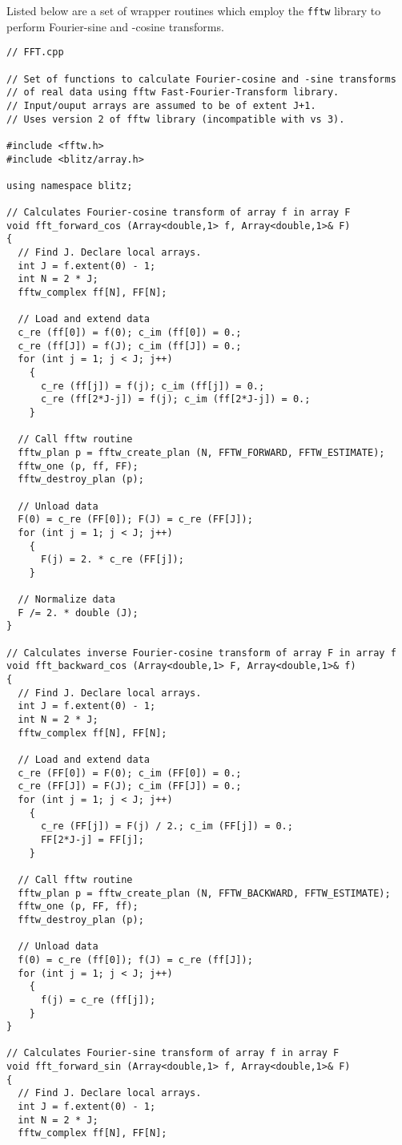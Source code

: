 Listed below are a set of wrapper routines which employ the {\tt fftw} library to
perform Fourier-sine and -cosine transforms.
{\small\begin{verbatim}
// FFT.cpp

// Set of functions to calculate Fourier-cosine and -sine transforms
// of real data using fftw Fast-Fourier-Transform library.
// Input/ouput arrays are assumed to be of extent J+1.
// Uses version 2 of fftw library (incompatible with vs 3).

#include <fftw.h>
#include <blitz/array.h>

using namespace blitz;

// Calculates Fourier-cosine transform of array f in array F
void fft_forward_cos (Array<double,1> f, Array<double,1>& F)
{
  // Find J. Declare local arrays.
  int J = f.extent(0) - 1;
  int N = 2 * J;
  fftw_complex ff[N], FF[N];

  // Load and extend data
  c_re (ff[0]) = f(0); c_im (ff[0]) = 0.;
  c_re (ff[J]) = f(J); c_im (ff[J]) = 0.;
  for (int j = 1; j < J; j++)
    {
      c_re (ff[j]) = f(j); c_im (ff[j]) = 0.;
      c_re (ff[2*J-j]) = f(j); c_im (ff[2*J-j]) = 0.;
    }

  // Call fftw routine
  fftw_plan p = fftw_create_plan (N, FFTW_FORWARD, FFTW_ESTIMATE);
  fftw_one (p, ff, FF);
  fftw_destroy_plan (p); 

  // Unload data
  F(0) = c_re (FF[0]); F(J) = c_re (FF[J]); 
  for (int j = 1; j < J; j++)
    {
      F(j) = 2. * c_re (FF[j]);
    }

  // Normalize data
  F /= 2. * double (J);
}

// Calculates inverse Fourier-cosine transform of array F in array f
void fft_backward_cos (Array<double,1> F, Array<double,1>& f)
{    
  // Find J. Declare local arrays.
  int J = f.extent(0) - 1;
  int N = 2 * J;
  fftw_complex ff[N], FF[N];

  // Load and extend data
  c_re (FF[0]) = F(0); c_im (FF[0]) = 0.;
  c_re (FF[J]) = F(J); c_im (FF[J]) = 0.;
  for (int j = 1; j < J; j++)
    {
      c_re (FF[j]) = F(j) / 2.; c_im (FF[j]) = 0.;
      FF[2*J-j] = FF[j];
    }

  // Call fftw routine
  fftw_plan p = fftw_create_plan (N, FFTW_BACKWARD, FFTW_ESTIMATE);
  fftw_one (p, FF, ff);
  fftw_destroy_plan (p); 

  // Unload data 
  f(0) = c_re (ff[0]); f(J) = c_re (ff[J]); 
  for (int j = 1; j < J; j++)
    {
      f(j) = c_re (ff[j]);
    }
}

// Calculates Fourier-sine transform of array f in array F
void fft_forward_sin (Array<double,1> f, Array<double,1>& F)
{  
  // Find J. Declare local arrays.
  int J = f.extent(0) - 1;
  int N = 2 * J;
  fftw_complex ff[N], FF[N];
  

\end{verbatim}}
